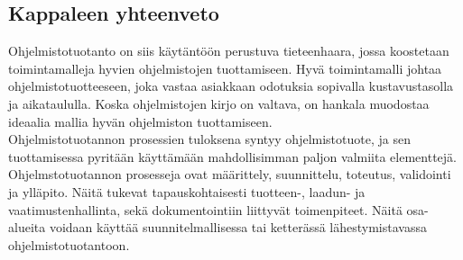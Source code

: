 \documentclass[finnish,12pt,a4paper,pdftex]{article}
\begin{document}



\subsection{Kappaleen yhteenveto}

Ohjelmistotuotanto on siis käytäntöön perustuva tieteenhaara, jossa koostetaan toimintamalleja hyvien ohjelmistojen tuottamiseen. Hyvä toimintamalli johtaa ohjelmistotuotteeseen, joka vastaa asiakkaan odotuksia sopivalla kustavustasolla ja aikataululla. Koska ohjelmistojen kirjo on valtava, on hankala muodostaa ideaalia mallia hyvän ohjelmiston tuottamiseen.\\

\noindent Ohjelmistotuotannon prosessien tuloksena syntyy ohjelmistotuote, ja sen tuottamisessa pyritään käyttämään mahdollisimman paljon valmiita elementtejä. Ohjelmstotuotannon prosesseja ovat määrittely, suunnittelu, toteutus, validointi ja ylläpito. Näitä tukevat tapauskohtaisesti tuotteen-, laadun- ja vaatimustenhallinta, sekä dokumentointiin liittyvät toimenpiteet. Näitä osa-alueita voidaan käyttää suunnitelmallisessa tai ketterässä lähestymistavassa ohjelmistotuotantoon.\\
\end{document}

